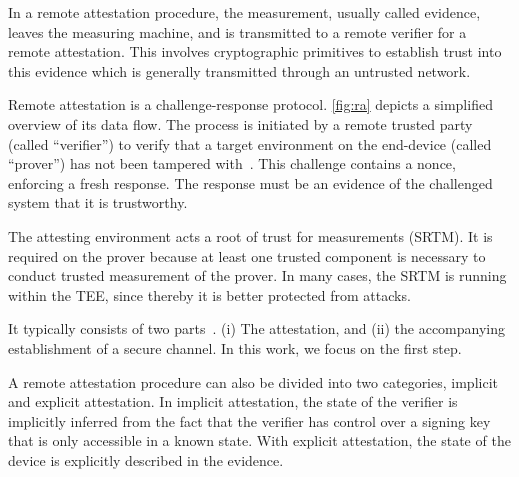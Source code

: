



In a remote attestation procedure, the measurement, usually called evidence, leaves the measuring machine, and is transmitted to a remote verifier for a remote attestation.
This involves cryptographic primitives to establish trust into this evidence which is generally transmitted through an untrusted network.

Remote attestation is a challenge-response protocol.
\autoref{fig:ra} depicts a simplified overview of its data flow.
The process is initiated by a remote trusted party (called ``verifier'') to verify that a target environment on the end-device (called ``prover'') has not been tampered with~\cite{Menetrey2022, Coker2011}. This challenge contains a nonce, enforcing a fresh response.
The response must be an evidence of the challenged system that it is trustworthy.

The attesting environment acts a root of trust for measurements (SRTM).
It is required on the prover because at least one trusted component is necessary to conduct trusted measurement of the prover. In many cases, the SRTM is running within the TEE, since thereby it is better protected from attacks.

It typically consists of two parts~\cite{McCune2008}.
(i) The attestation, and (ii) the accompanying establishment of a secure channel.
In this work, we focus on the first step.

A remote attestation procedure can also be divided into two categories, implicit and explicit attestation.
In implicit attestation, the state of the verifier is implicitly inferred from the fact that the verifier has control over a signing key that is only accessible in a known state.
With explicit attestation, the state of the device is explicitly described in the evidence.

